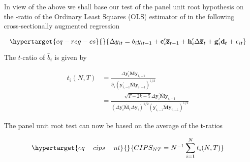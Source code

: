 \documentclass[
  12pt]{article}
\begin{document}
In view of the above we shall base our test of the panel unit root
hypothesis on the -ratio of the Ordinary Least Squares (OLS) estimator
of in the following cross-sectionally augmented regression

\begin{equation}\protect\hypertarget{eq-reg-cs}{}{
\Delta y_{i t}=b_i y_{i t-1}+\mathbf{c}_i^{\prime} \overline{\mathbf{z}}_{t-1}+\mathbf{h}_i^{\prime} \Delta \overline{\mathbf{z}}_t+\mathbf{g}_i^{\prime} \mathbf{d}_t+\epsilon_{i t}
}\label{eq-reg-cs}\end{equation}

The \(t\)-ratio of \(\hat{b}_i\) is given by

\[
\begin{aligned}
t_i(N, T) &=\frac{\Delta \mathbf{y}_i^{\prime} \overline{\mathbf{M}} \mathbf{y}_{i,-1}}{\hat{\sigma}_i\left(\mathbf{y}_{i,-1}^{\prime} \overline{\mathbf{M}} \mathbf{y}_{i,-1}\right)^{1 / 2}} \\
&=\frac{\sqrt{T-2 k-5} \Delta \mathbf{y}_i^{\prime} \overline{\mathbf{M}} \mathbf{y}_{i,-1}}{\left(\Delta \mathbf{y}_i^{\prime} \overline{\mathbf{M}}_i \Delta \mathbf{y}_i\right)^{1 / 2}\left(\mathbf{y}_{i,-1}^{\prime} \overline{\mathbf{M}} \mathbf{y}_{i,-1}\right)^{1 / 2}}
\end{aligned}
\]

The panel unit root test can now be based on the average of the t-ratios

\begin{equation}\protect\hypertarget{eq-cips-nt}{}{
C I P S_{N T}=N^{-1} \sum_{i=1}^N t_i(N, T)
}\label{eq-cips-nt}\end{equation}


  
\end{document}
